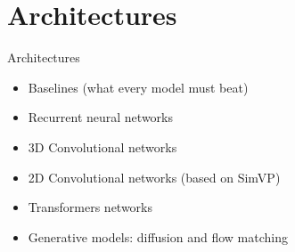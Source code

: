 \documentclass{beamer}
\begin{document}
\section{Architectures}

\newcommand{\baselinepanel}[3]{%
    \begin{minipage}[t]{0.48\textwidth}
        \centering
        {\footnotesize\textbf{#1}}\\[-2pt]
        \begin{tikzpicture}[x=0.42cm, y=0.32cm,
            declare function={f(\x) = 2 + 0.8*sin(\x*180) + 0.15*\x + 0.15*sin(\x*470);}]
            \fill[gray!10] (6,0.6) rectangle (8,4.2);
            \draw[gray!60, -{Stealth[length=1.2mm]}] (0,0.6) -- (8.4,0.6) node[right, font=\tiny, black] {$t$};
            \draw[gray!60] (6,0.6) -- (6,4.2);
            \node[font=\tiny, gray] at (3,4.0) {history};
            \node[font=\tiny, gray] at (7,4.0) {forecast};
            \draw[thick, PastelGreen!50!black, smooth, samples=80, domain=0:6] plot (\x, {f(\x)});
            \draw[gray!60, smooth, samples=30, domain=6:8] plot (\x, {f(\x)});
            #2
        \end{tikzpicture}\\[-1pt]
        {\scriptsize #3}
    \end{minipage}%
}


\begin{frame}{Architectures}
    \begin{itemize}
        \item Baselines (what every model must beat)
        \item Recurrent neural networks
        \item 3D Convolutional networks
        \item 2D Convolutional networks (based on SimVP)
        \item Transformers networks
        \item Generative models: diffusion and flow matching
    \end{itemize}
\end{frame}
\end{document}
